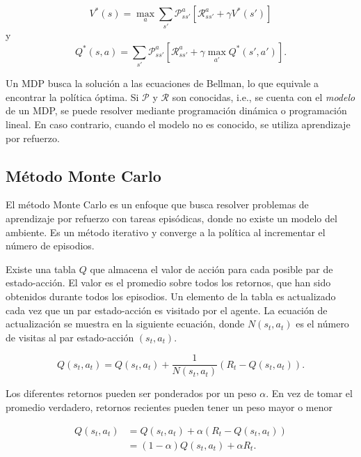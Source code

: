 \[
V^*(s) = \max_{a}\sum_{s'}\mathcal{P}_{ss'}^a[\mathcal{R}_{ss'}^a + \gamma V^*(s')]
\]
y 
\[
Q^*(s,a) = \sum_{s'}\mathcal{P}_{ss'}^a[\mathcal{R}_{ss'}^a + \gamma \max_{a'}Q^*(s',a')].
\]

Un MDP busca la solución a las ecuaciones de Bellman, lo que equivale a encontrar
la política óptima. Si $\mathcal{P}$ y $\mathcal{R}$ son conocidas, i.e., se cuenta con el \textit{modelo} de un MDP, se puede resolver mediante programación dinámica o programación lineal. En caso contrario, cuando el modelo no es conocido, se utiliza aprendizaje por refuerzo.

\subsection{Método Monte Carlo}\label{subsection-montecarlo}

El método Monte Carlo es un enfoque que busca resolver problemas
de aprendizaje por refuerzo con tareas episódicas, donde 
no existe un modelo del ambiente. 
Es un método iterativo y converge a la política
al incrementar el número de episodios.

Existe una tabla $Q$ que almacena el valor de acción para cada posible
par de estado-acción. El valor es el promedio sobre
todos los retornos, que han sido obtenidos durante todos los episodios. 
Un elemento de la tabla es actualizado cada vez que un par estado-acción
es visitado por el agente. La ecuación de actualización se muestra en la 
siguiente ecuación, donde $N(s_t, a_t)$ es el número de visitas al 
par estado-acción $(s_t, a_t)$.

\[
Q(s_t, a_t) = Q(s_t, a_t) + \frac{1}{N(s_t, a_t)} (R_t - Q(s_t, a_t)).
\]

Los diferentes retornos pueden 
ser ponderados por un peso $\alpha$.
En vez de tomar el promedio
verdadero, retornos recientes pueden tener un peso mayor o menor

\begin{equation}\label{eq:montecarlo-update}
\begin{split}
Q(s_t, a_t) &= Q(s_t, a_t) + \alpha(R_t - Q(s_t, a_t))\\
&= (1-\alpha)Q(s_t, a_t) + \alpha R_t.
\end{split}
\end{equation}

